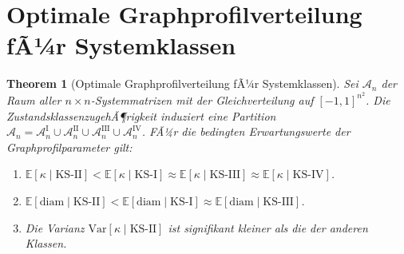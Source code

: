 ﻿\documentclass[12pt, a4paper, titlepage]{report}
\newtheorem{theorem}{Theorem}[section]
\theoremstyle{definition}
\theoremstyle{remark}
\newcommand{\KS}{\mathrm{KS}}
\begin{document}
\section{Optimale Graphprofilverteilung fÃ¼r Systemklassen}

\begin{theorem}[Optimale Graphprofilverteilung fÃ¼r Systemklassen]
\label{thm:opt_profil}
Sei $\mathcal{A}_n$ der Raum aller $n \times n$-Systemmatrizen mit der Gleichverteilung
auf $[-1,1]^{n^2}$. Die ZustandsklassenzugehÃ¶rigkeit induziert eine Partition
$\mathcal{A}_n = \mathcal{A}_n^{\mathrm{I}} \cup \mathcal{A}_n^{\mathrm{II}} \cup
\mathcal{A}_n^{\mathrm{III}} \cup \mathcal{A}_n^{\mathrm{IV}}$.
FÃ¼r die bedingten Erwartungswerte der Graphprofilparameter gilt:
\begin{enumerate}[label=(\roman*)]
  \item $\mathbb{E}[\kappa \mid \KS\text{-II}] < \mathbb{E}[\kappa \mid \KS\text{-I}]
    \approx \mathbb{E}[\kappa \mid \KS\text{-III}]
    \approx \mathbb{E}[\kappa \mid \KS\text{-IV}]$.
  \item $\mathbb{E}[\mathrm{diam} \mid \KS\text{-II}] <
    \mathbb{E}[\mathrm{diam} \mid \KS\text{-I}]
    \approx \mathbb{E}[\mathrm{diam} \mid \KS\text{-III}]$.
  \item Die Varianz $\mathrm{Var}[\kappa \mid \KS\text{-II}]$ ist signifikant
    kleiner als die der anderen Klassen.
\end{enumerate}
\end{theorem}
\end{document}
